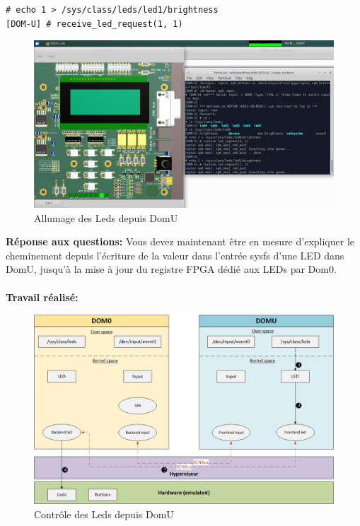 \begin{lstlisting}
# echo 1 > /sys/class/leds/led1/brightness 
[DOM-U] # receive_led_request(1, 1)
\end{lstlisting}
\begin{figure}[H]
	\begin{center}
		\includegraphics[width=17cm]{img/dom04.png}
		\caption{Allumage des Leds depuis DomU}
		\label{dom04}
	\end{center}
\end{figure}
\textbf{Réponse aux questions: }Vous devez maintenant être en mesure d'expliquer le cheminement depuis l’écriture de la valeur
dans l’entrée sysfs d’une LED dans DomU, jusqu’à la mise à jour du registre FPGA dédié aux LEDs
par Dom0.\\\\
\textbf{Travail réalisé: }
\begin{figure}[H]
	\begin{center}
		\includegraphics[width=17cm]{img/virt3.png}
		\caption{Contrôle des Leds depuis DomU}
		\label{virt3}
	\end{center}
\end{figure}
